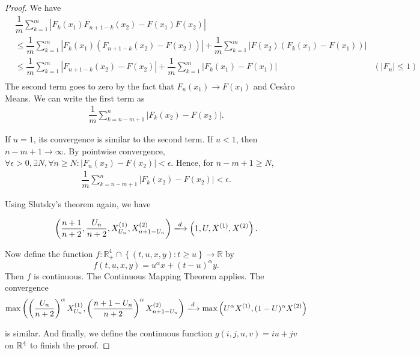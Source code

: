 \begin{proof}
  We have
  \begin{align*}
     & \dfrac{1}{m}\sum_{k=1}^{m} \left|F_k(x_1)F_{n+1-k}(x_2)-F(x_1) F(x_2)\right|                                                                                                       \\
     & \le \dfrac{1}{m}\sum_{k=1}^{m} \left|F_k(x_1)\left(F_{n+1-k}(x_2)-F(x_2)\right)\right| + \dfrac{1}{m}\sum_{k=1}^{m} \left|F(x_2)\left(F_k(x_1)-F(x_1)\right)\right|                \\
     & \le \dfrac{1}{m}\sum_{k=1}^{m} \left|F_{n+1-k}(x_2)-F(x_2)\right| + \dfrac{1}{m}\sum_{k=1}^{m} \left|F_k(x_1)-F(x_1)\right|                                         & (|F_n|\le 1) \\
  \end{align*}
  The second term goes to zero by the fact that $F_n(x_1)\to F(x_1)$ and Cesàro Means. We can write the first term as
  \begin{align*}
    \dfrac{1}{m}\sum_{k=n-m+1}^{n} \left|F_{k}(x_2)-F(x_2)\right|.
  \end{align*}

  If $u=1$, its convergence is similar to the second term. If $u<1$, then $n-m+1 \to \infty$. By pointwise convergence,$\forall \epsilon>0, \exists N, \forall n\ge N: |F_n(x_2)-F(x_2)|<\epsilon$. Hence, for $n-m+1\ge N$,
  \begin{align*}
    \dfrac{1}{m}\sum_{k=n-m+1}^{n} \left|F_{k}(x_2)-F(x_2)\right| < \epsilon.
  \end{align*}

  Using Slutsky's theorem again, we have

  $$\left(\dfrac{n+1}{n+2}, \dfrac{U_n}{n+2}, X_{U_n}^{(1)}, X_{n+1-U_n}^{(2)}\right) \xlongrightarrow{d} \left(1, U, X^{(1)}, X^{(2)}\right).$$

  Now define the function $f:\mathbb{R}^4_+\cap \left\{(t,u,x,y): t\ge u\right\} \to \mathbb{R}$ by
  $$f(t,u,x,y) = u^\alpha x + (t-u)^\alpha y.$$
  Then $f$ is continuous. The Continuous Mapping Theorem applies. The convergence
  $$\max\left(\left(\dfrac{U_n}{n+2}\right)^\alpha X_{U_n}^{(1)}, \left(\dfrac{n+1-U_n}{n+2}\right)^\alpha X_{n+1-U_n}^{(2)}\right) \xlongrightarrow{d} \max\left(U^\alpha X^{(1)}, (1-U)^\alpha X^{(2)}\right)$$

  is similar. And finally, we define the continuous function $g(i,j,u,v) = iu+jv$ on ${\mathbb{R}}^4$ to finish the proof.


\end{proof}

